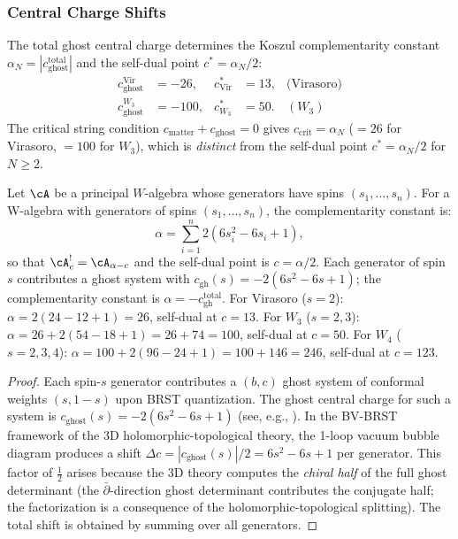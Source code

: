 \subsubsection{Central Charge Shifts}

The total ghost central charge determines the Koszul complementarity
constant $\alpha_N = |c_{\mathrm{ghost}}^{\mathrm{total}}|$
and the self-dual point $c^* = \alpha_N/2$:
\begin{align}
c_{\mathrm{ghost}}^{\mathrm{Vir}} &= -26, &
 c^*_{\mathrm{Vir}} &= 13, & \text{(Virasoro)}\\
c_{\mathrm{ghost}}^{W_3} &= -100, &
 c^*_{W_3} &= 50. & (W_3)
\end{align}
The critical string condition $c_{\mathrm{matter}} + c_{\mathrm{ghost}} = 0$
gives $c_{\mathrm{crit}} = \alpha_N$ ($= 26$ for Virasoro, $= 100$ for
$W_3$), which is \emph{distinct} from the self-dual point
$c^* = \alpha_N/2$ for $N \ge 2$.

\begin{theorem}
\label{thm:central-charge-shift}
Let\/ $\cA$ be a principal $W$-algebra whose generators have spins
$(s_1,\ldots,s_n)$.
For a W-algebra with generators of spins $(s_1, \ldots, s_n)$, the complementarity constant is:
\begin{equation}
\label{eq:central-charge-shift}
\alpha = \sum_{i=1}^n 2(6s_i^2 - 6s_i + 1),
\end{equation}
so that $\cA_c^! = \cA_{\alpha - c}$ and the self-dual point is $c = \alpha/2$.
Each generator of spin~$s$ contributes a ghost system with $c_{\mathrm{gh}}(s) = -2(6s^2 - 6s + 1)$;
the complementarity constant is $\alpha = -c_{\mathrm{gh}}^{\mathrm{total}}$.
For Virasoro ($s=2$): $\alpha = 2(24 - 12 + 1) = 26$, self-dual at $c = 13$. For $W_3$ ($s=2,3$): $\alpha = 26 + 2(54 - 18 + 1) = 26 + 74 = 100$, self-dual at $c = 50$. For $W_4$ ($s=2,3,4$): $\alpha = 100 + 2(96 - 24 + 1) = 100 + 146 = 246$, self-dual at $c = 123$.
\end{theorem}

\begin{proof}
Each spin-$s$ generator contributes a $(b,c)$ ghost system of conformal weights $(s, 1-s)$ upon BRST quantization. The ghost central charge for such a system is $c_{\text{ghost}}(s) = -2(6s^2 - 6s + 1)$ (see, e.g., \cite{FMS86,Pol98}). In the BV-BRST framework of the 3D holomorphic-topological theory, the 1-loop vacuum bubble diagram produces a shift $\Delta c = |c_{\text{ghost}}(s)|/2 = 6s^2 - 6s + 1$ per generator. This factor of $\tfrac{1}{2}$ arises because the 3D theory computes the \emph{chiral half} of the full ghost determinant (the $\bar\partial$-direction ghost determinant contributes the conjugate half; the factorization is a consequence of the holomorphic-topological splitting). The total shift is obtained by summing over all generators.
\end{proof}

